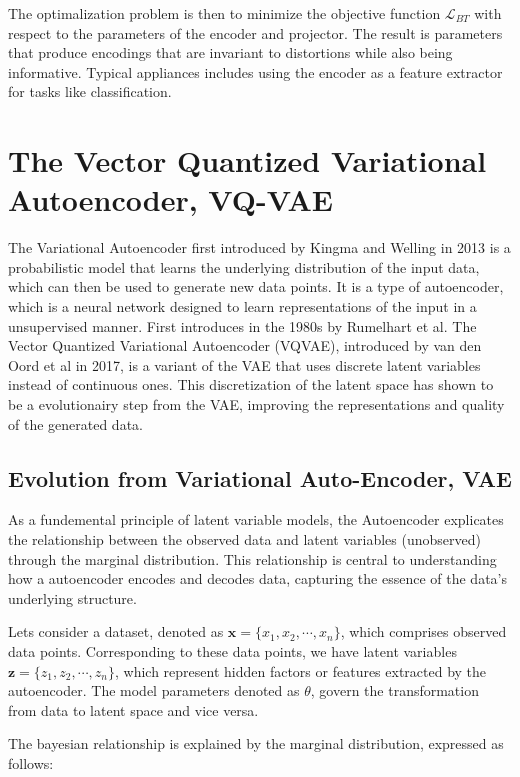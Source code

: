 The optimalization problem is then to minimize the objective function $\mathcal{L}_{BT}$ with respect to the parameters of the encoder and projector. The result is parameters that produce encodings that are invariant to distortions while also being informative.
Typical appliances includes using the encoder as a feature extractor for tasks like classification.

\section{The Vector Quantized Variational Autoencoder, VQ-VAE}
The Variational Autoencoder first introduced by Kingma and Welling in 2013\cite{VAE} is a probabilistic model that learns the underlying distribution of the input data, which can then be used to generate new data points. It is a type of autoencoder, which is a neural network designed to learn
representations of the input in a unsupervised manner. First introduces in the 1980s by Rumelhart et al\cite{Rumelhart}. The Vector Quantized Variational Autoencoder (VQVAE), introduced by van den Oord et al\cite{neuvqvae} in 2017, is a variant of the VAE that uses discrete latent variables instead of continuous ones.
This discretization of the latent space has shown to be a evolutionairy step from the VAE, improving the representations and quality of the generated data.

\subsection{Evolution from Variational Auto-Encoder, VAE}
As a fundemental principle of latent variable models, the Autoencoder explicates the relationship between the observed data and latent variables (unobserved) through the marginal distribution. This relationship is central to understanding how a autoencoder encodes and decodes data, capturing the essence of the data's underlying structure.

Lets consider a dataset, denoted as $\mathbf{x}=\{x_1, x_2, \cdots, x_n \}$, which comprises observed data points. Corresponding to these data points, we have latent variables $\mathbf{z}=\{z_1, z_2, \cdots, z_n \}$, which represent hidden factors or features extracted by the autoencoder.
The model parameters denoted as $\theta$, govern the transformation from data to latent space and vice versa.

The bayesian relationship is explained by the marginal distribution, expressed as follows:

